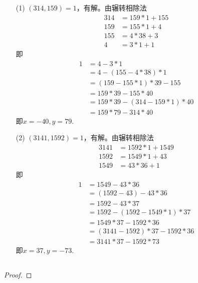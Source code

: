 \documentclass[UTF8]{ctexart}
\begin{document}
\subsection{}   %
\begin{enumerate}
    \item [(1)]$(314,159)=1$，有解。由辗转相除法
    \begin{align*}
        314 & = 159*1 + 155\\
        159 & = 155*1 + 4\\
        155 & = 4*38 + 3\\
        4 & = 3*1 + 1  
    \end{align*}
    即
    \begin{align*}
        1 
        & = 4 - 3*1\\
        & = 4 - (155-4*38)*1\\
        & = (159-155*1)*39 - 155\\
        & = 159*39 - 155*40\\
        & = 159*39 - (314-159*1)*40\\
        & = 159*79 - 314*40
    \end{align*}
    即$x=-40,y=79$.
    \item [(2)]$(3141,1592)=1$，有解。由辗转相除法
    \begin{align*}
        3141 & = 1592*1 + 1549\\
        1592 & = 1549*1 + 43\\
        1549 & = 43*36 + 1
    \end{align*}
    即
    \begin{align*}
        1 
        & = 1549 - 43*36\\
        & = (1592 - 43) - 43*36\\
        & = 1592 - 43*37\\
        & = 1592 - (1592 - 1549*1)*37\\
        & = 1549*37 - 1592*36\\
        & = (3141-1592)*37 - 1592*36\\
        & = 3141*37 - 1592*73
    \end{align*}
    即$x=37,y=-73$.
\end{enumerate}

\subsection{}   %
\begin{proof}
    
\end{proof}
\end{document}
